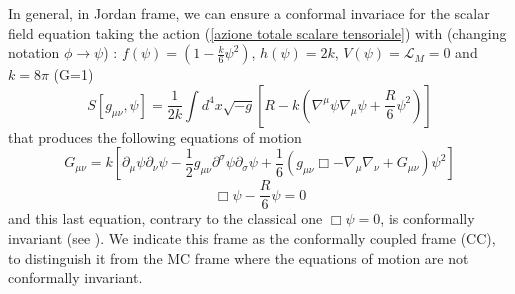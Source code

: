 In general, in Jordan frame, we can ensure a conformal invariace for the scalar field equation taking the action (\ref{azione totale scalare tensoriale})
with (changing notation $\phi \rightarrow \psi$) : $f(\psi) = (1-\frac{k}{6}\psi^2)$, $h(\psi) = 2k$, $V(\psi)=\mathcal{L}_M = 0$ and $k = 8\pi$ (G=1) 
\begin{equation}
    S[g_{\mu \nu}, \psi] = \frac{1}{2k} \int d^4x \sqrt{-g} \left[ R - k\left( \nabla^{\mu}\psi \nabla_{\mu}\psi  + \frac{R}{6}\psi^2\right) \right]
    \label{Azione G.R conforme}
\end{equation}
 that produces the following equations of motion
\begin{equation}
    G_{\mu\nu} = k  \left[\partial_{\mu}\psi\partial_{\nu}\psi - \frac{1}{2}g_{\mu\nu}\partial^{\sigma}\psi\partial_{\sigma}\psi + \frac{1}{6}\left(g_{\mu\nu}\Box - \nabla_{\mu}\nabla_{\nu} + G_{\mu\nu}\right)\psi^2\right] 
    \label{Equazioni G.R conforme scariche}
\end{equation}
\begin{equation}
    \Box \psi - \frac{R}{6}\psi=0 
    \label{K.G. conforme}
\end{equation}
and this last equation, contrary to the classical one $\Box\psi = 0$, is conformally invariant (see \citep{wald2010general}). We indicate this frame as the conformally coupled frame (CC), to distinguish it from the MC frame where the equations of motion are not conformally invariant. 

